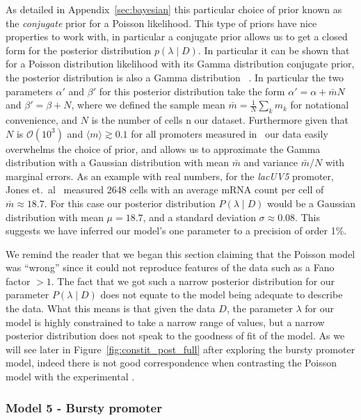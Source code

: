 As detailed in Appendix~\ref{sec:bayesian} this particular choice of prior known
as the \textit{conjugate} prior for a Poisson likelihood. This type of priors
have nice properties to work with, in particular a conjugate prior allows us to
get a closed form for the posterior distribution $p(\lambda \mid D)$. In
particular it can be shown that for a Poisson distribution likelihood with its
Gamma distribution conjugate prior, the posterior distribution is also a Gamma
distribution ~\cite{Gelman2013}. In particular the two parameters $\alpha'$ and
$\beta'$ for this posterior distribution take the form $\alpha' = \alpha +
\bar{m} N$ and $\beta' = \beta + N$, where we defined the sample mean $\bar{m} =
\frac{1}{N}\sum_k m_k$ for notational convenience, and $N$ is the number of
cells n our dataset. Furthermore given that $N$ is $\mathcal{O}(10^3)$ and
$\langle m\rangle \gtrsim 0.1$ for all promoters measured in~\cite{Jones2014}
our data easily overwhelms the choice of prior, and allows us to approximate the
Gamma distribution with a Gaussian distribution with mean $\bar{m}$ and variance
$\bar{m} / N$ with marginal errors. As an example with real numbers, for the
\textit{lacUV5} promoter, Jones et.\ al~\cite{Jones2014} measured 2648 cells
with an average mRNA count per cell of $\bar{m} \approx 18.7$. For this case our
posterior distribution $P(\lambda \mid D)$ would be a Gaussian distribution with
mean $\mu = 18.7$, and a standard deviation $\sigma \approx 0.08$. This suggests
we have inferred our model's one parameter to a precision of order 1\%.

We remind the reader that we began this section claiming that the Poisson model
was ``wrong'' since it could not reproduce features of the data such as a Fano
factor $> 1$. The fact that we got such a narrow posterior distribution for our
parameter $P(\lambda \mid D)$ does not equate to the model being adequate to
describe the data. What this means is that given the data $D$, the parameter 
$\lambda$ for our model is highly constrained to take a narrow range of values,
but a narrow posterior distribution does not speak to the goodness of fit of the
model. As we will see later in Figure~\ref{fig:constit_post_full} after
exploring the bursty promoter model, indeed there is not good correspondence
when contrasting the Poisson model with the experimental .

\subsubsection{Model 5 - Bursty promoter}


